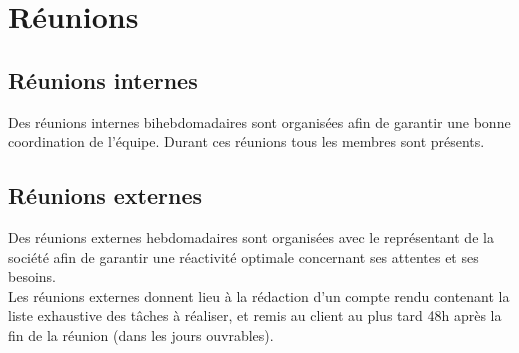 \documentclass[11pt,fleqn]{report}
\begin{document}
\section{Réunions}

\subsection{Réunions internes}
Des réunions internes bihebdomadaires sont organisées afin de garantir une bonne coordination de l'équipe. Durant ces réunions tous les membres sont présents.

\subsection{Réunions externes}
Des réunions externes hebdomadaires sont organisées avec le représentant de la société afin de garantir une réactivité optimale concernant ses attentes et ses besoins.
\\
Les réunions externes donnent lieu à la rédaction d'un compte rendu contenant la liste exhaustive des tâches à réaliser, et remis au client au plus tard 48h après la fin de la réunion (dans les jours ouvrables).
\end{document}
